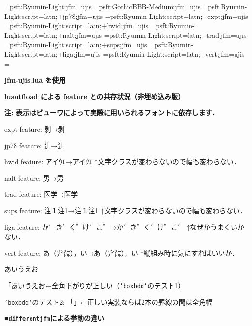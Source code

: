 

\jfont\tenmin={psft:Ryumin-Light:jfm=ujis}\tenmin
\jfont\tengoth={psft:GothicBBB-Medium:jfm=ujis}
\jfont\jisse={psft:Ryumin-Light:script=latn;+jp78;jfm=ujis}
\jfont\jisexpt={psft:Ryumin-Light:script=latn;+expt;jfm=ujis}
\jfont\jishwid={psft:Ryumin-Light:script=latn;+hwid;jfm=ujis}
\jfont\jisnalt={psft:Ryumin-Light:script=latn;+nalt;jfm=ujis}
\jfont\jistrad={psft:Ryumin-Light:script=latn;+trad;jfm=ujis}
\jfont\jissups={psft:Ryumin-Light:script=latn;+sups;jfm=ujis}
\jfont\jisliga={psft:Ryumin-Light:script=latn;+liga;jfm=ujis}
\jfont\jisvert={psft:Ryumin-Light:script=latn;+vert;jfm=ujis}
\parskip=\smallskipamount{}\zw

{\noindent\bf\tengoth jfm-ujis.lua を使用}

\bigskip

{\noindent\bf\tengoth luaotf\/load による feature との共存状況（非埋め込み版）}

{\noindent\bf\tengoth 注: 表示はビューワによって実際に用いられるフォントに依存します．}

{\tentt expt} feature: 剥→{\jisexpt 剥}

{\tentt jp78} feature: 辻→{\jisse 辻}

{\tentt hwid} feature: アイｳｴ→{\jishwid アイｳｴ}\hfil\break
↑文字クラスが変わらないので幅も変わらない．

{\tentt nalt} feature: 男→{\jisnalt 男}

{\tentt trad} feature: 医学→{\jistrad 医学}

{\tentt sups} feature: 注１注1→{\jissups 注１注1}\hfil\break
↑文字クラスが変わらないので幅も変わらない．

{\tentt liga} feature: か゜き゜く゜け゜こ゜→{\jisliga か゜き゜く゜け゜こ゜}\hfil\break
↑なぜかうまくいかない．%

{\tentt vert} feature: あ（㌢㍍），い→{\jisvert あ（㌢㍍），い}\hfil\break
↑縦組み時に気にすればいいか．

\bigskip

\noindent あいうえお

「あいうえお←全角下がりが正しい（{\tt'boxbdd'}のテスト1）

{\tt'boxbdd'}のテスト2: \vrule\hbox{「」}\vrule ←正しい実装ならば2本の罫線の間は全角幅


\bigskip
{\noindent\bf\tengt ■{\tt differentjfm}による挙動の違い}

